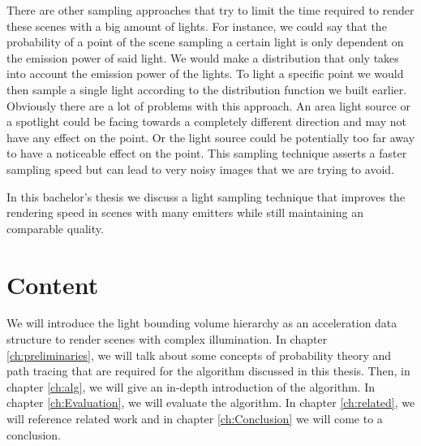 There are other sampling approaches that try to limit the time required to render these scenes with a big amount of lights. For instance, we could say that the probability of a point of the scene sampling a certain light is only dependent on the emission power of said light. We would make a distribution that only takes into account the emission power of the lights. To light a specific point we would then sample a single light according to the distribution function we built earlier. Obviously there are a lot of problems with this approach. An area light source or a spotlight could be facing towards a completely different direction and may not have any effect on the point. Or the light source could be potentially too far away to have a noticeable effect on the point. This sampling technique asserts a faster sampling speed but can lead to very noisy images that we are trying to avoid.

In this bachelor's thesis we discuss a light sampling technique that improves the rendering speed in scenes with many emitters while still maintaining an comparable quality.

\section{Content}
\label{sec:Introduction:Content}

We will introduce the light bounding volume hierarchy as an acceleration data structure to render scenes with complex illumination. In chapter \ref{ch:preliminaries}, we will talk about some concepts of probability theory and path tracing that are required for the algorithm discussed in this thesis. Then, in chapter \ref{ch:alg}, we will give an in-depth introduction of the algorithm. In chapter \ref{ch:Evaluation}, we will evaluate the algorithm. In chapter \ref{ch:related}, we will reference related work and in chapter \ref{ch:Conclusion} we will come to a conclusion.